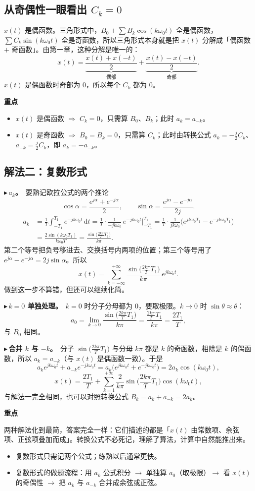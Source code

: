 \documentclass[UTF8,a4paper,11pt]{ctexart}
\newenvironment{remember}{\begin{rememberbox}\textbf{重点}\par\smallskip}{\end{rememberbox}}
\newcounter{ex}[section]
\newcommand{\point}[1]{\par\addvspace{1ex}\noindent\textcolor{ptteal}{$\blacktriangleright$\,\textbf{#1}}\ }
\begin{document}
\subsection{从奇偶性一眼看出 \texorpdfstring{$C_k=0$}{Ck=0}}
$x(t)$ 是偶函数。三角形式中，$B_0+\sum B_k\cos(k\omega_0t)$ 全是偶函数，$\sum C_k\sin(k\omega_0t)$ 全是奇函数，所以三角形式本身就是把 $x(t)$ 分解成「偶函数 $+$ 奇函数」。由第一章，这种分解是唯一的：
\[
x(t)=\underbrace{\frac{x(t)+x(-t)}{2}}_{\text{偶部}}+\underbrace{\frac{x(t)-x(-t)}{2}}_{\text{奇部}} .
\]
$x(t)$ 是偶函数时奇部为 $0$，所以每个 $C_k$ 都为 $0$。

\begin{remember}
\begin{itemize}[nosep]
\item $x(t)$ 是偶函数 $\Rightarrow$ $C_k=0$，只需算 $B_0$、$B_k$；此时 $a_k=a_{-k}$。
\item $x(t)$ 是奇函数 $\Rightarrow$ $B_0=B_k=0$，只需算 $C_k$；此时由转换公式 $a_k=-\frac{j}{2}C_k$、$a_{-k}=\frac{j}{2}C_k$，即 $a_k=-a_{-k}$。
\end{itemize}
\end{remember}

\subsection{解法二：复数形式}
\point{$a_k$。}要熟记欧拉公式的两个推论
\[
\cos\alpha=\frac{e^{j\alpha}+e^{-j\alpha}}{2},\qquad \sin\alpha=\frac{e^{j\alpha}-e^{-j\alpha}}{2j}.
\]
\begin{align*}
a_k&=\frac1T\int_{-T_1}^{T_1}e^{-jk\omega_0t}\,\mathrm{d}t=\frac1T\cdot\frac{1}{-jk\omega_0}\,e^{-jk\omega_0t}\Big|_{-T_1}^{T_1}
=\frac1T\cdot\frac{1}{jk\omega_0}\big(e^{jk\omega_0T_1}-e^{-jk\omega_0T_1}\big)\\
&=\frac{2\sin(k\omega_0T_1)}{k\omega_0T}=\frac{\sin\!\big(\frac{2k\pi}{T}T_1\big)}{k\pi}.
\end{align*}
第二个等号把负号移进去、交换括号内两项的位置；第三个等号用了 $e^{j\alpha}-e^{-j\alpha}=2j\sin\alpha$。所以
\[
x(t)=\sum_{k=-\infty}^{+\infty}\frac{\sin\!\big(\frac{2k\pi}{T}T_1\big)}{k\pi}\,e^{jk\omega_0t}.
\]
做到这一步不算错，但还可以继续化简。

\point{$k=0$ 单独处理。}$k=0$ 时分子分母都为 $0$，要取极限。$k\to0$ 时 $\sin\theta\approx\theta$：
\[
a_0=\lim_{k\to0}\frac{\sin\!\big(\frac{2k\pi}{T}T_1\big)}{k\pi}=\frac{\frac{2k\pi}{T}T_1}{k\pi}=\frac{2T_1}{T},
\]
与 $B_0$ 相同。

\point{合并 $k$ 与 $-k$。}分子 $\sin\!\big(\frac{2k\pi}{T}T_1\big)$ 与分母 $k\pi$ 都是 $k$ 的奇函数，相除是 $k$ 的偶函数，所以 $a_k=a_{-k}$（与 $x(t)$ 是偶函数一致）。于是
\[
a_ke^{jk\omega_0t}+a_{-k}e^{-jk\omega_0t}=a_k\big(e^{jk\omega_0t}+e^{-jk\omega_0t}\big)=2a_k\cos(k\omega_0t),
\]
\[
x(t)=\frac{2T_1}{T}+\sum_{k=1}^{+\infty}\frac{2}{k\pi}\sin\!\Big(\frac{2k\pi}{T}T_1\Big)\cos(k\omega_0t),
\]
与解法一完全相同，也可以对照转换公式 $B_k=a_k+a_{-k}=2a_k$。

\begin{remember}
两种解法化到最简，答案完全一样：它们描述的都是「$x(t)$ 由常数项、余弦项、正弦项叠加而成」。转换公式不必死记，理解了算法，计算中自然能推出来。
\begin{itemize}[nosep]
\item 复数形式只需记两个公式；练熟以后通常更快。
\item 复数形式的做题流程：用 $a_k$ 公式积分 $\to$ 单独算 $a_0$（取极限）$\to$ 看 $x(t)$ 的奇偶性 $\to$ 把 $a_k$ 与 $a_{-k}$ 合并成余弦或正弦。
\end{itemize}
\end{remember}
\end{document}
